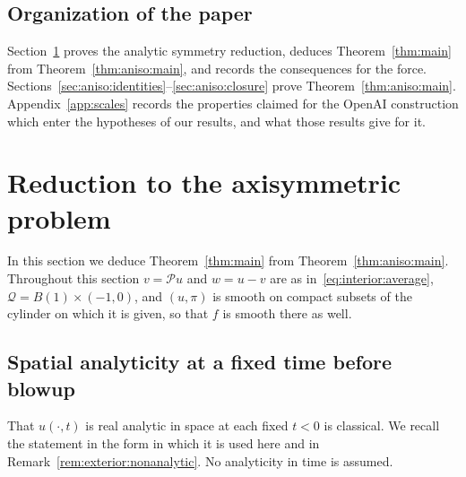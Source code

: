 \documentclass[11pt,reqno]{amsproc}
\numberwithin{equation}{section}
\theoremstyle{remark}
\begin{document}
\subsection{Organization of the paper}
\label{sec:aniso:organization}

Section~\ref{sec:reduction} proves the analytic symmetry reduction, deduces Theorem~\ref{thm:main} from Theorem~\ref{thm:aniso:main}, and records the consequences for the force. Sections~\ref{sec:aniso:identities}--\ref{sec:aniso:closure} prove Theorem~\ref{thm:aniso:main}. Appendix~\ref{app:scales} records the properties claimed for the OpenAI construction which enter the hypotheses of our results, and what those results give for it.

\section{Reduction to the axisymmetric problem}
\label{sec:reduction}

In this section we deduce Theorem~\ref{thm:main} from Theorem~\ref{thm:aniso:main}. Throughout this section $v=\mathcal Pu$ and $w=u-v$ are as in~\eqref{eq:interior:average}, $\mathcal Q=B(1)\times(-1,0)$, and $(u,\pi)$ is smooth on compact subsets of the cylinder on which it is given, so that $f$ is smooth there as well.

\subsection{Spatial analyticity at a fixed time before blowup}
\label{sec:exterior:analytic}
That $u(\cdot,t)$ is real analytic in space at each fixed $t<0$ is classical. We recall the statement in the form in which it is used here and in Remark~\ref{rem:exterior:nonanalytic}. No analyticity in time is assumed.
\end{document}
